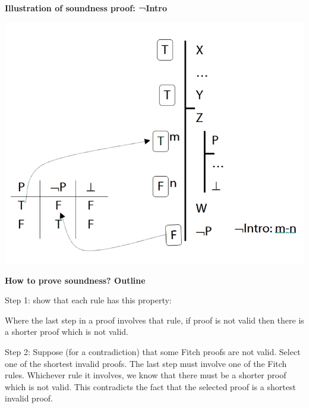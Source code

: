\documentclass[12pt]{extarticle}
\begin{document}
\begin{multicols*}{3}
\begin{minipage}{\columnwidth}
\textbf{Illustration of soundness proof: ¬Intro}
 
\begin{center}
\includegraphics[scale=0.3]{img/soundness_not.png}
\end{center}
\end{minipage}
 
\begin{minipage}{\columnwidth}
 
\textbf{How to prove soundness? Outline}
 
Step 1: show that each rule has this property:
 
\hspace{5mm} Where the last step in a proof involves that rule, if proof is not valid then there is a shorter proof which is not valid.
 
Step 2: Suppose (for a contradiction) that some Fitch proofs are not valid. Select one of the shortest invalid proofs. The last step must involve one of the Fitch rules. Whichever rule it involves, we know that there must be a shorter proof which is not valid. This contradicts the fact that the selected proof is a shortest invalid proof.
 
\end{minipage}
 

 


\end{multicols*}
\end{document}

